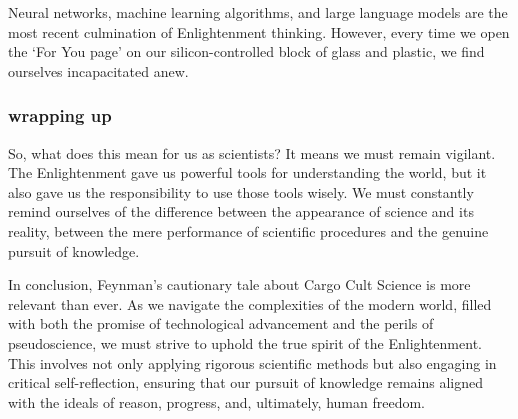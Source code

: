 Neural networks, machine learning algorithms, and large language models are the
most recent culmination of Enlightenment thinking. However, every time we open
the ‘For You page’ on our silicon-controlled block of glass and plastic, we
find ourselves incapacitated anew.

\subsubsection*{wrapping up}
So, what does this mean for us as scientists? It means we must remain vigilant.
The Enlightenment gave us powerful tools for understanding the world, but it
also gave us the responsibility to use those tools wisely. We must constantly
remind ourselves of the difference between the appearance of science and its
reality, between the mere performance of scientific procedures and the genuine
pursuit of knowledge.

In conclusion, Feynman’s cautionary tale about Cargo Cult Science is more
relevant than ever. As we navigate the complexities of the modern world, filled
with both the promise of technological advancement and the perils of
pseudoscience, we must strive to uphold the true spirit of the Enlightenment.
This involves not only applying rigorous scientific methods but also engaging
in critical self-reflection, ensuring that our pursuit of knowledge remains
aligned with the ideals of reason, progress, and, ultimately, human freedom.

